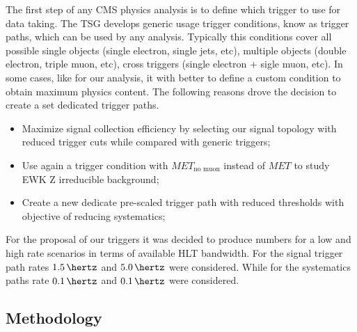 

The first step of any \gls{CMS} physics analysis is to define which trigger to use for data taking. The \gls{TSG} develops generic usage trigger conditions, know as trigger paths, which can be used by any analysis. Typically this conditions cover all possible single objects (single electron, single jets, etc), multiple objects (double electron, triple muon, etc), cross triggers (single electron $+$ sigle muon, etc). In some cases, like for our analysis, it with better to define a custom condition to obtain maximum physics content. The following reasons drove the decision to create a set dedicated trigger paths.

\begin{itemize}
  \item Maximize signal collection efficiency by selecting our signal topology with reduced trigger cuts while compared with generic triggers;
  \item Use again a trigger condition with $MET_{\text{no muon}}$ instead of $MET$ to study \gls{EWK} Z irreducible background;
  \item Create a new dedicate pre-scaled trigger path with reduced thresholds with objective of reducing systematics;
\end{itemize}

For the proposal of our triggers it was decided to produce numbers for a low and high rate scenarios in terms of available \gls{HLT} bandwidth. For the signal trigger path rates $1.5\,\hertz$ and $5.0\,\hertz$ were considered. While for the systematics paths rate $0.1\,\hertz$ and $0.1\,\hertz$ were considered.

\subsection{Methodology}

